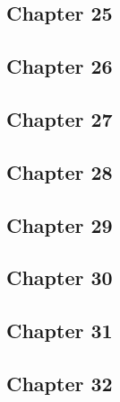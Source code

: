 \subsection*{Chapter 25}







\subsection*{Chapter 26}







\subsection*{Chapter 27}







\subsection*{Chapter 28}







\subsection*{Chapter 29}







\subsection*{Chapter 30}







\subsection*{Chapter 31}







\subsection*{Chapter 32}







